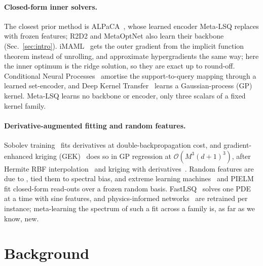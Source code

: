 \documentclass[fullpaper,final]{nldl}
\theoremstyle{plain}
\theoremstyle{definition}
\begin{document}
\paragraph{Closed-form inner solvers.}
The closest prior method is ALPaCA~\citep{harrison2018alpaca}, whose learned
encoder Meta-LSQ replaces with frozen features; R2D2 and MetaOptNet also learn
their backbone (Sec.~\ref{sec:intro}). iMAML~\citep{rajeswaran2019imaml} gets the outer gradient from the
implicit function theorem instead of unrolling, and \citet{lorraine2020implicithg}
approximate hypergradients the same way; here the inner optimum is the ridge
solution, so they are exact up to round-off.
Conditional Neural Processes~\citep{garnelo2018cnp} amortise the support-to-query
mapping through a learned set-encoder, and Deep Kernel
Transfer~\citep{patacchiola2020dkt} learns a Gaussian-process (GP) kernel. Meta-LSQ learns no
backbone or encoder, only three scalars of a fixed kernel family.

\paragraph{Derivative-augmented fitting and random features.}
Sobolev training~\citep{czarnecki2017sobolev} fits derivatives at
double-backpropagation cost, and gradient-enhanced kriging
(GEK)~\citep{laurent2019gek} does so in GP regression at $\mathcal{O}(M^3 (d{+}1)^3)$, after Hermite RBF
interpolation~\citep{wu1992hermite} and kriging with
derivatives~\citep{morris1993derivatives}. Random features are due to
\citet{rahimi2007rff}, \citet{tancik2020fourierfeat} tied them to spectral bias,
and extreme learning machines~\citep{huang2015elm} and
PIELM~\citep{dwivedi2020pielm} fit closed-form read-outs over a frozen random
basis. FastLSQ~\citep{sulc2026fastlsq} solves one PDE at a time with sine
features, and physics-informed networks~\citep{raissi2019pinn} are retrained per
instance; meta-learning the spectrum of such a fit across a family is, as far as
we know, new.

\section{Background}
\label{sec:background}
\end{document}
